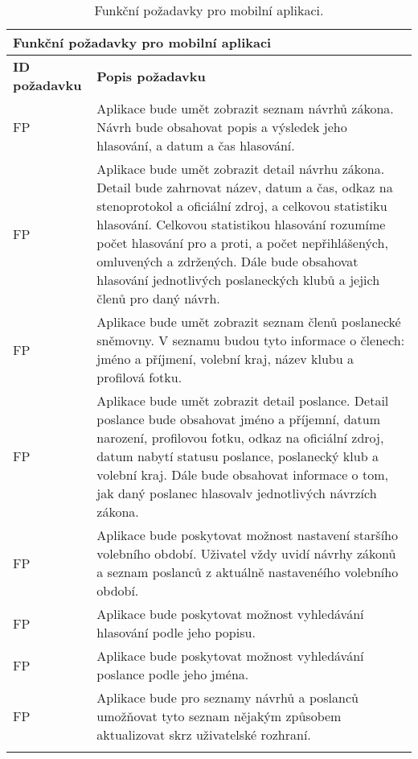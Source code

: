 \def\arraystretch{1.5}
\begin{longtable}{|l|p{9cm}|} \hline
	\multicolumn{2}{|l|}{\textbf{Funkční požadavky pro mobilní aplikaci}} \\ \hline
	
	\textbf{ID požadavku} & \textbf{Popis požadavku} \\ \hline
	
	FP\textunderscore01	& Aplikace bude umět zobrazit seznam návrhů zákona. Návrh bude obsahovat popis a výsledek jeho hlasování, a datum a čas hlasování. \\ \hline
	
	FP\textunderscore02	& Aplikace bude umět zobrazit detail návrhu zákona. Detail bude zahrnovat název, datum a čas, odkaz na stenoprotokol a oficiální zdroj, a celkovou statistiku hlasování. Celkovou statistikou hlasování rozumíme počet hlasování pro a proti, a počet nepřihlášených, omluvených a zdržených. Dále bude obsahovat hlasování jednotlivých poslaneckých klubů a jejich členů pro daný návrh. \\ \hline
	
	FP\textunderscore03	& Aplikace bude umět zobrazit seznam členů poslanecké sněmovny. V seznamu budou tyto informace o členech: jméno a příjmení, volební kraj, název klubu a profilová fotku. \\ \hline
	
	FP\textunderscore04	& Aplikace bude umět zobrazit detail poslance. Detail poslance bude obsahovat jméno a příjemní, datum narození, profilovou fotku, odkaz na oficiální zdroj, datum nabytí statusu poslance, poslanecký klub a volební kraj. Dále bude obsahovat informace o tom, jak daný poslanec hlasovalv jednotlivých návrzích zákona. \\ \hline
	
	FP\textunderscore05	& Aplikace bude poskytovat možnost nastavení staršího volebního období. Uživatel vždy uvidí návrhy zákonů a seznam poslanců z aktuálně nastavenéího volebního období.\\ \hline
	
	FP\textunderscore06	& Aplikace bude poskytovat možnost vyhledávání hlasování podle jeho popisu.\\ \hline
	
	FP\textunderscore07	& Aplikace bude poskytovat možnost vyhledávání poslance podle jeho jména.\\ \hline
	
	FP\textunderscore07	& Aplikace bude pro seznamy návrhů a poslanců umožňovat tyto seznam nějakým způsobem aktualizovat skrz uživatelské rozhraní.\\ \hline
	
	\caption{Funkční požadavky pro mobilní aplikaci.}
	\label{table:func_req_app}
\end{longtable}

